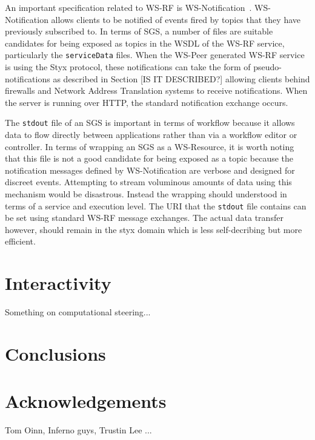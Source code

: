 \documentclass{llncs}
\begin{document}
An important specification related to WS-RF is WS-Notification~\cite{wsrf-notification}. WS-Notification allows clients to be notified of events fired by topics that they have previously subscribed to. In terms of SGS, a number of files are suitable candidates for being exposed as topics in the WSDL of the WS-RF service, particularly the \texttt{serviceData} files. When the WS-Peer generated WS-RF service is using the Styx protocol, these notifications can take the form of pseudo-notifications as described in Section [IS IT DESCRIBED?] allowing clients behind firewalls and Network Address Translation systems to receive notifications. When the server is running over HTTP, the standard notification exchange occurs.

The \texttt{stdout} file of an SGS is important in terms of workflow because it allows data to flow directly between applications rather than via a workflow editor or controller. In terms of wrapping an SGS as a WS-Resource, it is worth noting that this file is not a good candidate for being exposed as a topic  because the notification messages defined by WS-Notification are verbose and designed for discreet events. Attempting to stream voluminous amounts of data using this mechanism would be disastrous. Instead the wrapping should understood in terms of a service and execution level. The URI that the \texttt{stdout} file contains can be set using standard WS-RF message exchanges. The actual data transfer however, should remain in the styx domain which is less self-decribing but more efficient.



\section{Interactivity} \label{sec:interactivity}
Something on computational steering...

\section{Conclusions}


\section*{Acknowledgements}
Tom Oinn, Inferno guys, Trustin Lee ...
%
%


\end{document}

